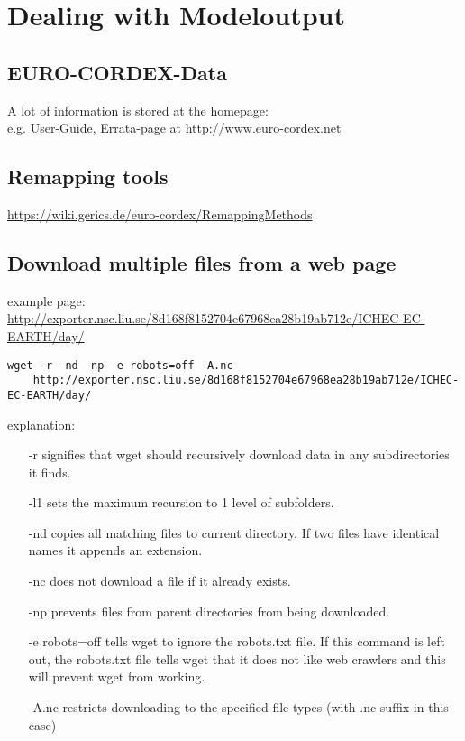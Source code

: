 \section{Dealing with Modeloutput}

\subsection{EURO-CORDEX-Data}
A lot of information is stored at the homepage:\\
e.g. User-Guide, Errata-page at \url{http://www.euro-cordex.net}

\subsection{Remapping tools}
\url{https://wiki.gerics.de/euro-cordex/RemappingMethods}

\subsection{Download multiple files from a web page}

example page: \url{http://exporter.nsc.liu.se/8d168f8152704e67968ea28b19ab712e/ICHEC-EC-EARTH/day/}
{\small 
\begin{verbatim}
wget -r -nd -np -e robots=off -A.nc 
    http://exporter.nsc.liu.se/8d168f8152704e67968ea28b19ab712e/ICHEC-EC-EARTH/day/
\end{verbatim}}

explanation:
\begin{itemize}
\item[-r] signifies that wget should recursively download data in any subdirectories it finds.
\item[-l1] sets the maximum recursion to 1 level of subfolders.
\item[-nd] copies all matching files to current directory. If two files have identical names it appends an extension.
\item[-nc] does not download a file if it already exists.
\item[-np] prevents files from parent directories from being downloaded.
\item[-e robots=off] tells wget to ignore the robots.txt file. If this command is left out, the robots.txt file tells wget that it does not like web crawlers and this will prevent wget from working.
\item[-A.nc] restricts downloading to the specified file types (with .nc suffix in this case)
\end{itemize}

